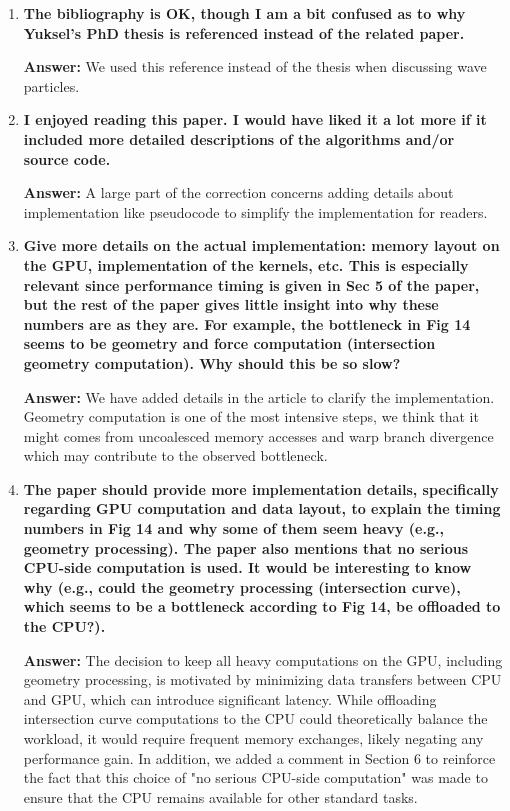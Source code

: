 \documentclass{article}
\newcommand{\answer}[1]{\textbf{\textcolor{answercolor}{Answer:}} \textcolor{answercolor}{#1}}
\begin{document}
\begin{enumerate}[label=\textbf{\arabic*.}]
	\item \textbf{The bibliography is OK, though I am a bit confused as to why Yuksel's PhD thesis is referenced instead of the related paper.}

	      \answer{We used this reference instead of the thesis when discussing wave particles.}

	\item \textbf{I enjoyed reading this paper. I would have liked it a lot more if it included more detailed descriptions of the algorithms and/or source code.}

	      \answer{A large part of the correction concerns adding details about implementation like pseudocode to simplify the implementation for readers.}

	\item \textbf{Give more details on the actual implementation: memory layout on the GPU, implementation of the kernels, etc. This is especially relevant since performance timing is given in Sec 5 of the paper, but the rest of the paper gives little insight into why these numbers are as they are. For example, the bottleneck in Fig 14 seems to be geometry and force computation (intersection geometry computation). Why should this be so slow?}

	      \answer{We have added details in the article to clarify the implementation. Geometry computation is one of the most intensive steps, we think that it might comes from uncoalesced memory accesses and warp branch divergence which may contribute to the observed bottleneck.}

	\item \textbf{The paper should provide more implementation details, specifically regarding GPU computation and data layout, to explain the timing numbers in Fig 14 and why some of them seem heavy (e.g., geometry processing). The paper also mentions that no serious CPU-side computation is used. It would be interesting to know why (e.g., could the geometry processing (intersection curve), which seems to be a bottleneck according to Fig 14, be offloaded to the CPU?).}

	      \answer{The decision to keep all heavy computations on the GPU, including geometry processing, is motivated by minimizing data transfers between CPU and GPU, which can introduce significant latency. While offloading intersection curve computations to the CPU could theoretically balance the workload, it would require frequent memory exchanges, likely negating any performance gain. In addition, we added a comment in Section 6 to reinforce the fact that this choice of "no serious CPU-side computation" was made to ensure that the CPU remains available for other standard tasks.}


\end{enumerate}
\end{document}
